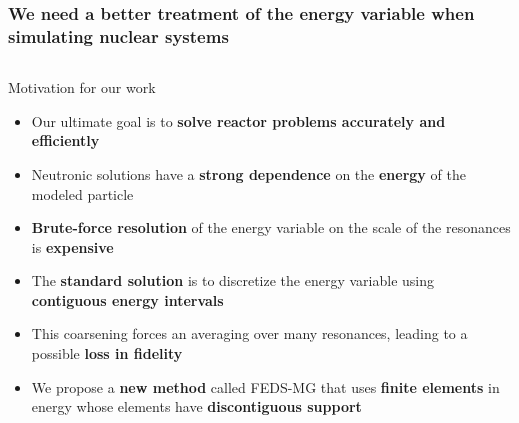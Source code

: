 \documentclass[compress,10pt]{beamer}
\begin{document}
\begin{frame}
   \frametitle{We need a better treatment of the energy variable when simulating nuclear systems}

\vspace{-1.5mm}

\begin{columns}[c] %


\centering


\begin{block}{Motivation for our work}
\begin{itemize}
  \small
  \item<1-> Our ultimate goal is to \textbf{solve reactor problems accurately and efficiently}
  \item<2-> Neutronic solutions have a \textbf{strong dependence} on the \textbf{energy} of the modeled particle
  \item<3-> \textbf{Brute-force resolution} of the energy variable on the scale of the resonances is \textbf{expensive}
  \item<4-> The \textbf{standard solution} is to discretize the energy variable using \textbf{contiguous energy intervals}
  \item<5-> This coarsening forces an averaging over many resonances, leading to a possible \textbf{loss in fidelity}
  \item<6-> We propose a \textbf{new method} called FEDS-MG that uses \textbf{finite elements} in energy whose elements have \textbf{discontiguous support}
  \end{itemize}
\end{block}


\centering
{}

\end{columns}
\end{frame}
\end{document}
